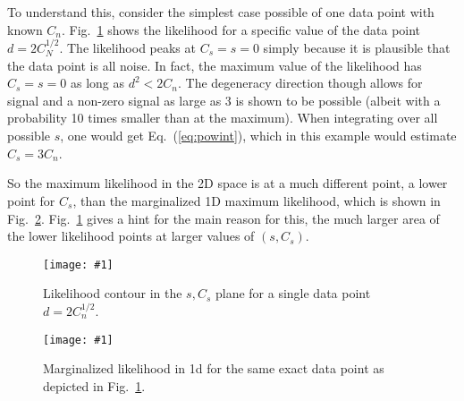 \documentclass[11pt, oneside]{article}   	%
\newcommand{\ec}[1]{Eq.~(\ref{eq:#1})}
\newcommand{\sfig}[2]{
\texttt{[image: \#1]}
        }
\newcommand{\Spng}[2]{
   \begin{figure}[thbp]
   \begin{center}
    \sfig{#1.png}{0.9\columnwidth}
    \caption{{\small #2}}
    \label{fig:#1}
     \end{center}
   \end{figure}
}
\newcommand{\rf}[1]{\ref{fig:#1}}
\begin{document}
To understand this, consider the simplest case possible of one data point with known $C_n$. Fig.~\rf{l2} shows the likelihood for a specific value of the data point $d=2C_N^{1/2}$. The likelihood peaks at $C_s=s=0$ simply because it is plausible that the data point is all noise. In fact, the maximum value of the likelihood has $C_s=s=0$ as long as $d^2<2C_n$. The degeneracy direction though allows for signal and a non-zero signal as large as 3 is shown to be possible (albeit with a probability 10 times smaller than at the maximum). When integrating over all possible $s$, one would get \ec{powint}, which in this example would estimate $\hat C_s=3C_n$. 


So the maximum likelihood in the 2D space is at a much different point, a lower point for $C_s$, than the marginalized 1D maximum likelihood, which is shown in Fig.~\rf{like1d}. Fig.~\rf{l2} gives a hint for the main reason for this, the much larger area of the lower likelihood points at larger values of $(s,C_s)$.
\Spng{l2}{Likelihood contour in the $s,C_s$ plane for a single data point $d=2C_n^{1/2}$.}
\Spng{like1d}{Marginalized likelihood in 1d for the same exact data point as depicted in Fig.~\rf{l2}.}
\end{document}
